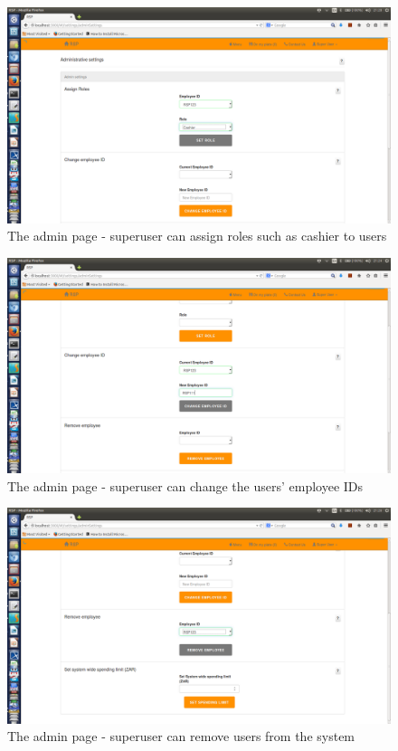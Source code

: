 \documentclass[a4paper,12pt]{report}
\begin{document}
\begin{figure}[H]
  \centering
    \includegraphics[width=1.0\textwidth]{screenshots/assignRole.png}
    \caption{The admin page - superuser can assign roles such as cashier to users} 
\end{figure}

\begin{figure}[H]
  \centering
    \includegraphics[width=1.0\textwidth]{screenshots/changeEmplid.png}
    \caption{The admin page - superuser can change the users' employee IDs} 
\end{figure}

\begin{figure}[H]
  \centering
    \includegraphics[width=1.0\textwidth]{screenshots/removeUser.png}
    \caption{The admin page - superuser can remove users from the system} 
\end{figure}
\end{document}
